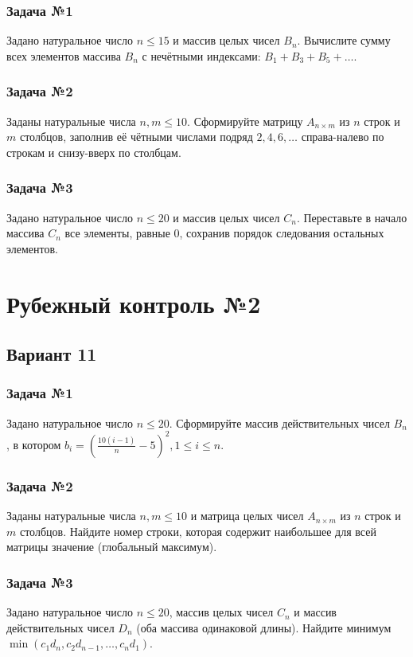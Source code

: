\documentclass[12pt,a5paper,landscape]{report}
\begin{document}
\subsubsection*{Задача №1}
Задано натуральное число $n \le 15$ и массив целых чисел $B_n$. Вычислите сумму всех элементов массива $B_n$ с нечётными индексами: $B_1+B_3+B_5+\ldots $.
\subsubsection*{Задача №2}
Заданы натуральные числа $n, m \le 10$. Сформируйте матрицу $A_{n \times m}$ из $n$ строк и $m$ столбцов, заполнив её чётными числами подряд $2, 4, 6, \ldots$ справа-налево по строкам и снизу-вверх по столбцам.
\subsubsection*{Задача №3}
Задано натуральное число $n \le 20$ и массив целых чисел $C_n$. Переставьте в начало массива $C_n$ все элементы, равные $0$, сохранив порядок следования остальных элементов.


\clearpage
\section*{Рубежный контроль №2}
\subsection*{Вариант 11}
\subsubsection*{Задача №1}
Задано натуральное число $n \le 20$. Сформируйте массив действительных чисел $B_n$, в котором $b_i = (\frac {10(i-1)} {n}-5)^2, 1 \le i \le n$.
\subsubsection*{Задача №2}
Заданы натуральные числа $n, m \le 10$ и матрица целых чисел $A_{n \times m}$ из $n$ строк и $m$ столбцов. Найдите номер строки, которая содержит наибольшее для всей матрицы значение (глобальный максимум).
\subsubsection*{Задача №3}
Задано натуральное число $n \le 20$, массив целых чисел $C_n$ и массив действительных чисел $D_n$ (оба массива одинаковой длины). Найдите минимум $\min({ c_1 d_n, c_2 d_{n-1}, \ldots, c_n d_1 })$.
\end{document}
